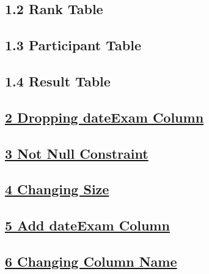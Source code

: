 \subsection*{1.2 Rank Table}


\newpage
\subsection*{1.3 Participant Table}


\subsection*{1.4 Result Table}


\vspace{0.35cm}
\subsection*{\underline{2 Dropping dateExam Column}}


\vspace{0.35cm}
\subsection*{\underline{3 Not Null Constraint}}


\vspace{0.35cm}
\subsection*{\underline{4 Changing Size}}


\vspace{0.35cm}
\subsection*{\underline{5 Add dateExam Column}}


\vspace{0.35cm}
\subsection*{\underline{6 Changing Column Name}}


\vspace{0.35cm}
